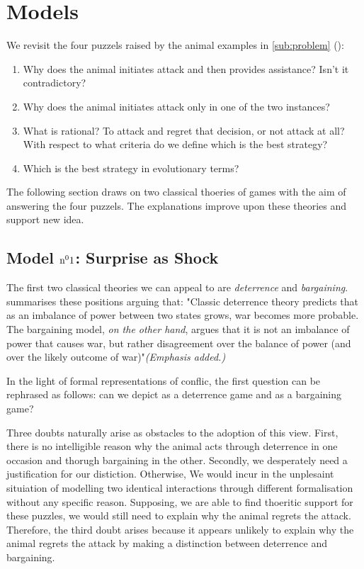 
\section{Models}

We revisit the four puzzels raised by the animal examples in \autoref{sub:problem} ():

\begin{enumerate}
  \item Why does the animal initiates attack and then provides assistance? Isn't it contradictory?
  \item Why does the animal initiates attack only in one of the two instances?
  \item What is rational? To attack and regret that decision, or not attack at all? With respect to what criteria do we define which is the best strategy?
  \item Which is the best strategy in evolutionary terms?
\end{enumerate}

The following section draws on two classical thoeries of games with the aim of answering the four puzzels. The explanations improve upon these theories and support new idea.

\subsection{Model \(\text{n}^{{\small{0}}}1\): Surprise as Shock} \label{sub:model1}
The first two classical theories we can appeal to are \textit{deterrence} and \textit{bargaining}. \textcite{reiterExploringBargainingModel2003} summarises these positions arguing that: "Classic deterrence theory predicts that as an imbalance of power between two states grows, war becomes more probable. The bargaining model, \textit{on the other hand}, argues that it is not an imbalance of power that causes war, but rather disagreement over the balance of power (and over the likely outcome of war)"\textit{\small{(Emphasis added.)}}

\vspace*{1em}
In the light of formal representations of conflic, the first question can be rephrased as follows: can we depict  as a deterrence game and   as a bargaining game?

\vspace*{1em}
Three doubts naturally arise as obstacles to the adoption of this view.
First, there is no intelligible reason why the animal acts through deterrence in one occasion and thorugh bargaining in the other. Secondly, we desperately need a justification for our distiction. Otherwise, We would incur in the unplesaint situiation of modelling two identical interactions through different formalisation without any specific reason. Supposing, we are able to find thoeritic support for these puzzles, we would still need to explain why the animal regrets the attack. Therefore, the third doubt arises because it appears unlikely to explain why the animal regrets the attack by making a distinction between deterrence and bargaining.

